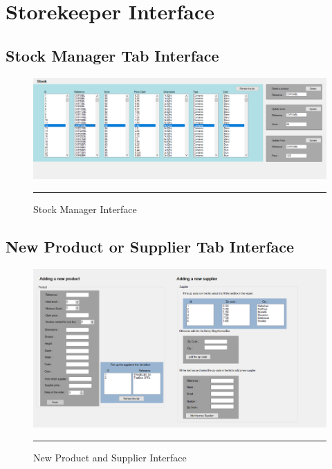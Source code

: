\newpage
\section{Storekeeper Interface}
\label{Storekeeperinterface}
    \subsection{Stock Manager Tab Interface}
        \vfill
        \begin{figure}[h!]
            \centering
    		\includegraphics[width =1.2\textwidth,angle = 90]{Figures/StockManagerTab.png}
    		\rule{35em}{0.5pt}
    		\caption{Stock Manager Interface}
    		\label{stocktab}
    	\end{figure}
    	\vfill
    	
	\newpage
	\subsection{New Product or Supplier Tab Interface}
    	\vfill
        \begin{figure}[h!]
            \centering
    		\includegraphics[width =1.2\textwidth,angle = 90]{Figures/SupplierTab.png}
    		\rule{35em}{0.5pt}
    		\caption{New Product and Supplier Interface}
    		\label{suppliertab}
    	\end{figure}
    	\vfill
    	
